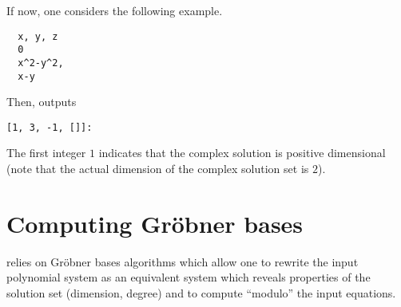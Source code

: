 \documentclass[a4paper,english,11pt]{scrartcl}
\theoremstyle{definition}
\theoremstyle{remark}
\begin{document}
If now, one considers the following example.
\begin{tcolorbox}
\begin{verbatim}
  x, y, z
  0
  x^2-y^2,
  x-y
\end{verbatim}
\end{tcolorbox}
Then, \msolve outputs
\begin{tcolorbox}
\begin{verbatim}
[1, 3, -1, []]:
\end{verbatim}
\end{tcolorbox}
The first integer $1$ indicates that the complex solution is positive
dimensional (note that the actual dimension of the complex solution set is $2$).


\section{Computing Gr\"obner bases}

\msolve relies on Gr\"obner bases algorithms which allow one to rewrite the
input polynomial system as an equivalent system which reveals properties of the
solution set (dimension, degree) and to compute ``modulo'' the input equations.
\end{document}
